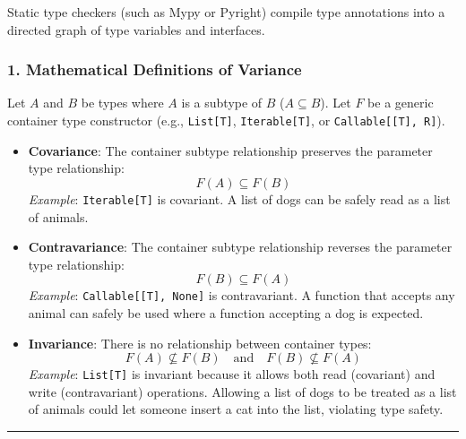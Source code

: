 Static type checkers (such as Mypy or Pyright) compile type annotations
into a directed graph of type variables and interfaces.

\hypertarget{mathematical-definitions-of-variance}{%
\subsubsection{1. Mathematical Definitions of
Variance}\label{mathematical-definitions-of-variance}}

Let \(A\) and \(B\) be types where \(A\) is a subtype of \(B\)
(\(A \subseteq B\)). Let \(F\) be a generic container type constructor
(e.g., \passthrough{\lstinline!List[T]!},
\passthrough{\lstinline!Iterable[T]!}, or
\passthrough{\lstinline!Callable[[T], R]!}).

\begin{itemize}
\tightlist
\item
  \textbf{Covariance}: The container subtype relationship preserves the
  parameter type relationship: \[F(A) \subseteq F(B)\] \emph{Example}:
  \passthrough{\lstinline!Iterable[T]!} is covariant. A list of dogs can
  be safely read as a list of animals.
\item
  \textbf{Contravariance}: The container subtype relationship reverses
  the parameter type relationship: \[F(B) \subseteq F(A)\]
  \emph{Example}: \passthrough{\lstinline!Callable[[T], None]!} is
  contravariant. A function that accepts any animal can safely be used
  where a function accepting a dog is expected.
\item
  \textbf{Invariance}: There is no relationship between container types:
  \[F(A) \not\subseteq F(B) \quad \text{and} \quad F(B) \not\subseteq F(A)\]
  \emph{Example}: \passthrough{\lstinline!List[T]!} is invariant because
  it allows both read (covariant) and write (contravariant) operations.
  Allowing a list of dogs to be treated as a list of animals could let
  someone insert a cat into the list, violating type safety.
\end{itemize}

\begin{center}\rule{0.5\linewidth}{0.5pt}\end{center}
